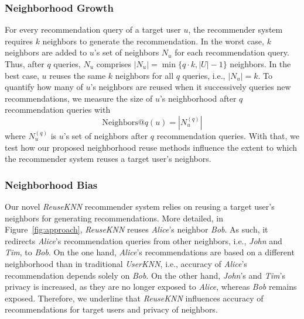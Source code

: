 \documentclass[manuscript,review,anonymous]{acmart}
\begin{document}
\subsubsection{Neighborhood Growth}
For every recommendation query of a target user $u$, the recommender system requires $k$ neighbors to generate the recommendation.
In the worst case, $k$ neighbors are added to $u$'s set of neighbors $N_u$ for each recommendation query.
Thus, after $q$ queries, $N_u$ comprises $|N_u| = \min\{ q \cdot k, |U|-1 \}$ neighbors.
In the best case, $u$ reuses the same $k$ neighbors for all $q$ queries, i.e., $|N_u| = k$.
To quantify how many of $u$'s neighbors are reused when it successively queries new recommendations, we measure the size of $u$'s neighborhood after $q$ recommendation queries with
\begin{equation}
    \mathrm{Neighbors}@q(u) = |N^{(q)}_u|
\end{equation}
where $N^{(q)}_u$ is $u$'s set of neighbors after $q$ recommendation queries.
With that, we test how our proposed neighborhood reuse methods influence the extent to which the recommender system reuses a target user's neighbors. 

\subsubsection{Neighborhood Bias}
\label{subsubsec:acc_priv_bias}
Our novel \emph{ReuseKNN} recommender system relies on reusing a target user's neighbors for generating recommendations.
More detailed, in Figure~\ref{fig:approach}, \emph{ReuseKNN} reuses \emph{Alice}'s neighbor \emph{Bob}.
As such, it redirects \emph{Alice}'s recommendation queries from other neighbors, i.e., \emph{John} and \emph{Tim}, to \emph{Bob}.
On the one hand, \emph{Alice}'s recommendations are based on a different neighborhood than in traditional \emph{UserKNN}, i.e., accuracy of \emph{Alice}'s recommendation depends solely on \emph{Bob}.
On the other hand, \emph{John}'s and \emph{Tim}'s privacy is increased, as they are no longer exposed to \emph{Alice}, whereas \emph{Bob} remains exposed.
Therefore, we underline that \emph{ReuseKNN} influences accuracy of recommendations for target users and privacy of neighbors.
\end{document}
